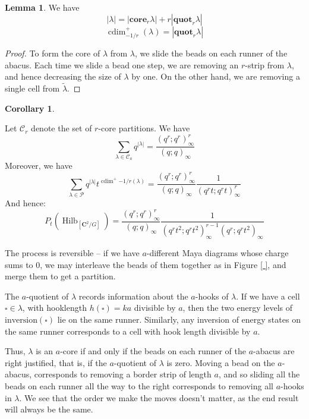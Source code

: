 \documentclass{amsart}[12pt]
\theoremstyle{definition}
\newtheorem{lemma}[dummy]{Lemma}
\newtheorem{corollary}[dummy]{Corollary}
\newcommand{\C}{\mathbf{C}}
\newcommand{\core}{\mathbf{core}}
\newcommand{\quot}{\mathbf{quot}}
\DeclareMathOperator{\Hilb}{Hilb}
\DeclareMathOperator{\cdim}{cdim}
\begin{document}
\begin{lemma}
We have
$$|\lambda|=|\core_r{\lambda}|+r|\quot_r{\lambda}|$$
$$\cdim^+_{-1/r}(\lambda)=|\quot_r{\lambda}|$$
\end{lemma}

\begin{proof}
To form the core of $\lambda$ from $\lambda$, we slide the beads on each runner of the abacus.  Each time we slide a bead one step, we are removing an $r$-strip from $\lambda$, and hence decreasing the size of $\lambda$ by one.  On the other hand, we are removing a single cell from $\tilde{\lambda}$.


\end{proof}


\begin{corollary} \label{cor:product-formulas-traditional-cores}

Let $\mathcal{C}_r$ denote the set of $r$-core partitions.  We have
$$\sum_{\lambda\in\mathcal{C}_a} q^{|\lambda|}=\frac{(q^r;q^r)_\infty^r}{(q;q)_\infty}$$
Moreover, we have 
$$\sum_{\lambda\in\mathcal{P}} q^{|\lambda|} t^{\cdim^+{-1/r}(\lambda)}=\frac{(q^r;q^r)_\infty^r}{(q;q)_\infty}\frac{1}{(q^rt;q^rt)_\infty^r}$$
And hence:
$$P_t(\Hilb_{[\C^2/G]})=\frac{(q^r;q^r)_\infty^r}{(q;q)_\infty}\frac{1}{(q^rt^2;q^rt^2)_\infty^{r-1}(q^r;q^rt^2)_\infty}$$
\end{corollary}





The process is reversible -- if we have $a$-different Maya diagrams whose charge sums to $0$, we may interleave the beads of them together as in Figure \ref{ }, and merge them to get a partition.  


The $a$-quotient of $\lambda$ records information about the $a$-hooks of $\lambda$.  If we have a cell $\square\in\lambda$,  with hooklength $h(\square)=ka$ divisible by $a$, then the two energy levels of $\textrm{inversion}(\square)$ lie on the same runner.  Similarly, any inversion of energy states on the same runner corresponds to a cell with hook length divisible by $a$.  

Thus, $\lambda$ is an $a$-core if and only if the beads on each runner of the $a$-abacus are right justified, that is, if the $a$-quotient of $\lambda$ is zero.  Moving a bead on the $a$-abacus, corresponds to removing a border strip of length $a$, and so sliding all the beads on each runner all the way to the right corresponds to removing all $a$-hooks in $\lambda$.  We see that the order we make the moves doesn't matter, as the end result will always be the same.
\end{document}
